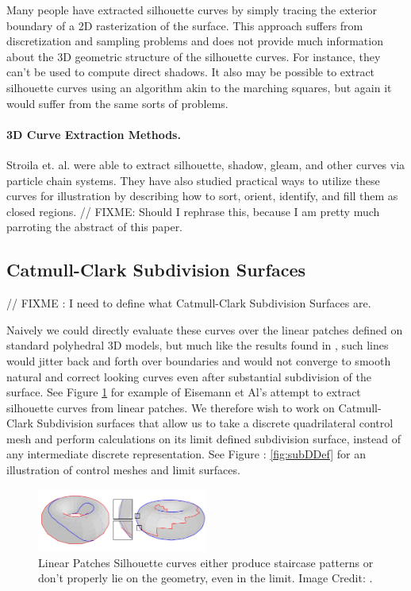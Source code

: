 \documentclass[12pt, letterpaper]{article}
\begin{document}
		Many people have extracted silhouette curves by simply tracing the exterior boundary of a 2D rasterization of the surface. This approach suffers from 
		discretization and sampling problems and does not provide much information about the 3D geometric structure of the silhouette curves.
		For instance, they can't be used to compute direct shadows.
		It also may be possible to extract silhouette curves using an algorithm akin to the marching squares, but again it would suffer from the same sorts of problems.
	
	\paragraph{3D Curve Extraction Methods.}

	Stroila et. al. were able to extract silhouette, shadow, gleam, and other curves via particle chain systems. They have also studied practical ways to utilize these curves
	for illustration by describing how to sort, orient, identify, and fill them as closed regions. \cite{SEH08} // FIXME: Should I rephrase this, because 
	I am pretty much parroting the abstract of this paper.

	\subsection{Catmull-Clark Subdivision Surfaces}
	
	// FIXME : I need to define what Catmull-Clark Subdivision Surfaces are.

		Naively we could directly evaluate these curves over the linear patches defined on standard polyhedral 3D models,
		but much like the results found in \cite{Eisemann08},
		such lines would jitter back and forth over boundaries and would not converge to smooth natural and correct looking curves even after substantial
		subdivision of the surface. See Figure \ref{fig:Eisemann_linear_patches} for example of Eisemann et Al's attempt to extract silhouette
		curves from linear patches. We therefore wish to work on Catmull-Clark Subdivision surfaces that allow us to take a discrete quadrilateral control mesh
		and perform calculations on its limit defined subdivision surface, instead of any intermediate discrete representation.
		See Figure : \ref{fig:subDDef} for an illustration of control meshes and limit surfaces.

		\begin{figure}[h]
		\centering
		\includegraphics[width=0.5\textwidth]{Eisemann08_linear_patches}
		\caption{Linear Patches Silhouette curves either produce staircase patterns or don't properly lie on the geometry, even in the limit. Image Credit: \cite{Eisemann08}.}
		\label{fig:Eisemann_linear_patches}
		\end{figure}
\end{document}
